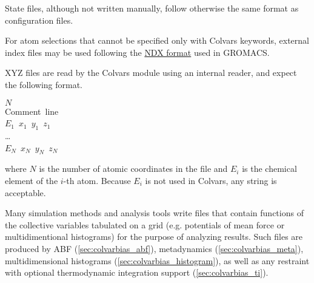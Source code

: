 State files, although not written manually, follow otherwise the same format as configuration files.


For atom selections that cannot be specified only with Colvars keywords, external index files may be used following the \href{http://manual.gromacs.org/documentation/current/reference-manual/file-formats.html\#ndx}{NDX format} used in GROMACS.


XYZ files are read by the Colvars module using an internal reader, and expect the following format.
\begin{mdexampleinput}
\-$N$\\
\-Comment~line\\
\-$E_{1}$~$x_{1}$~$y_{1}$~$z_{1}$\\
\-\ldots\\
\-$E_{N}$~$x_{N}$~$y_{N}$~$z_{N}$
\end{mdexampleinput}
\noindent{}where $N$ is the number of atomic coordinates in the file and $E_i$ is the chemical element of the $i$-th atom.
Because $E_i$ is not used in Colvars, any string is acceptable.





Many simulation methods and analysis tools write files that contain functions of the collective variables tabulated on a grid (e.g.{} potentials of mean force or multidimentional histograms) for the purpose of analyzing results.
Such files are produced by ABF (\ref{sec:colvarbias_abf}), metadynamics (\ref{sec:colvarbias_meta}), multidimensional histograms (\ref{sec:colvarbias_histogram}), as well as any restraint with optional thermodynamic integration support (\ref{sec:colvarbias_ti}).

